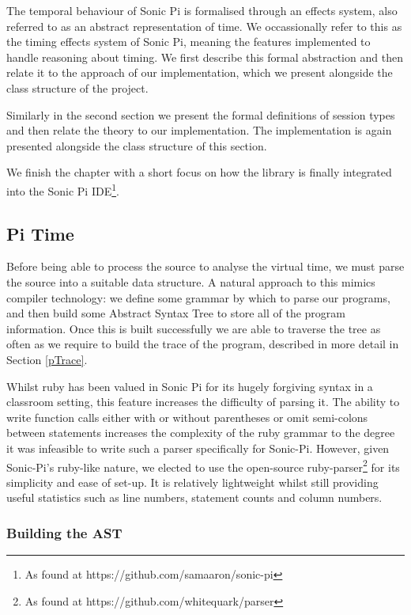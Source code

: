 \documentclass[11pt, abstracton, twoside, titlepage=true]{scrartcl}
\begin{document}
The temporal behaviour of Sonic Pi is formalised through an effects system, also 
referred to as an abstract representation of time. We occassionally refer to this 
as the timing effects system of Sonic Pi, meaning the features implemented to 
handle reasoning about timing. We first describe this formal abstraction and then 
relate it to the approach of our implementation, which we present alongside the 
class structure of the project. 

Similarly in the second section we present the formal definitions of session types 
and then relate the theory to our implementation. The implementation is again 
presented alongside the class structure of this section.

We finish the chapter with a short focus on how the library is finally integrated
into the Sonic Pi IDE\footnote{As found at https://github.com/samaaron/sonic-pi}.

\subsection{Pi Time}
Before being able to process the source to analyse the virtual time, we must parse 
the source into a suitable data structure. A 
natural approach to this mimics compiler technology: we define some
grammar by which to parse our programs, and then build some Abstract Syntax Tree 
to store all of the program information. Once this 
is built successfully we are able to traverse the tree as often as we require 
to build the trace of the program, described in more detail in Section \ref{pTrace}.

Whilst ruby has been valued in Sonic Pi for its hugely forgiving
syntax in a classroom setting, this feature increases the difficulty of parsing 
it. The ability to write function calls either with or without parentheses 
or omit semi-colons between statements increases the complexity of the ruby 
grammar to the degree it was infeasible to write such a parser specifically 
for Sonic-Pi. However, given Sonic-Pi's ruby-like nature, we elected to use 
the open-source ruby-parser\footnote{As found at https://github.com/whitequark/parser}
for its simplicity and ease of set-up. It is relatively lightweight whilst 
still providing useful statistics such as line numbers, statement counts and
column numbers. 
\newpage

\subsubsection{Building the AST} \label{build}
\end{document}
